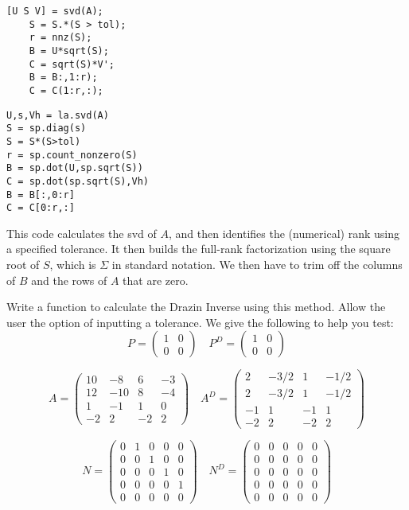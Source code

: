 \begin{matlab}
\begin{lstlisting}[style=matlab]
    [U S V] = svd(A);
    S = S.*(S > tol);
    r = nnz(S);
    B = U*sqrt(S);
    C = sqrt(S)*V';
    B = B:,1:r);
    C = C(1:r,:);
\end{lstlisting}
\end{matlab}
\begin{python}
\begin{lstlisting}[style=python]
U,s,Vh = la.svd(A)
S = sp.diag(s)
S = S*(S>tol)
r = sp.count_nonzero(S)
B = sp.dot(U,sp.sqrt(S))
C = sp.dot(sp.sqrt(S),Vh)
B = B[:,0:r]
C = C[0:r,:]
\end{lstlisting}
\end{python}
This code calculates the svd of $A$, and then identifies the (numerical) rank using a specified tolerance. It then builds the full-rank factorization using the square root of $S$, which is $\Sigma$ in standard notation. We then have to trim off the columns of $B$ and the rows of $A$ that are zero.

\begin{problem}
Write a function to calculate the Drazin Inverse using this method. Allow the user the option of inputting a tolerance. We give the following to help you test:
\[
P = \begin{pmatrix}
1 & 0 \\
0 & 0 
\end{pmatrix} \quad P^D = \begin{pmatrix}
1 & 0 \\
0 & 0 
\end{pmatrix}
\]

\[
A = \begin{pmatrix}
10 & -8 & 6 & -3 \\
12 & -10 & 8 & -4 \\
1 & -1 & 1 & 0 \\
-2 & 2 & -2 & 2
\end{pmatrix} \quad A^D = \begin{pmatrix}
2 & -3/2 & 1 & -1/2 \\
2 & -3/2 & 1 & -1/2 \\
-1 & 1 & -1 & 1 \\
-2 & 2 & -2 & 2
\end{pmatrix}
\]

\[
N = \begin{pmatrix}
0&1&0&0&0 \\
0&0&1&0&0 \\
0&0&0&1&0 \\
0&0&0&0&1 \\
0&0&0&0&0
\end{pmatrix} \quad N^D = \begin{pmatrix}
0&0&0&0&0 \\
0&0&0&0&0 \\
0&0&0&0&0 \\
0&0&0&0&0 \\
0&0&0&0&0
\end{pmatrix}
\]
\end{problem}

